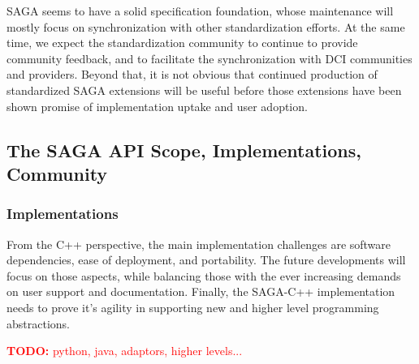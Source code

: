 \documentclass{article}
\newcommand{\B}[1]{\textbf{#1}}
\newcommand{\todo}[1]{{\textcolor{red}{\B{TODO:} #1 }}}
\newcommand{\todo}[1]{}
\begin{document}
  SAGA seems to have a solid specification foundation, whose maintenance
  will mostly focus on synchronization with other standardization
  efforts.  At the same time, we expect the standardization community to
  continue to provide community feedback, and to facilitate the
  synchronization with DCI communities and providers.  Beyond that, it
  is not obvious that continued production of standardized SAGA
  extensions will be useful before those extensions have been shown
  promise of implementation uptake and user adoption.  

  
 \subsection{The SAGA API Scope, Implementations, Community}

 \subsubsection{Implementations}

  From the C++ perspective, the main implementation challenges are
  software dependencies, ease of deployment, and portability.  The
  future developments will focus on those aspects, while balancing those
  with the ever increasing demands on user support and documentation.
  Finally, the SAGA-C++ implementation needs to prove it's agility in
  supporting new and higher level programming abstractions. 

  \todo{python, java, adaptors, higher levels...}


\end{document}
